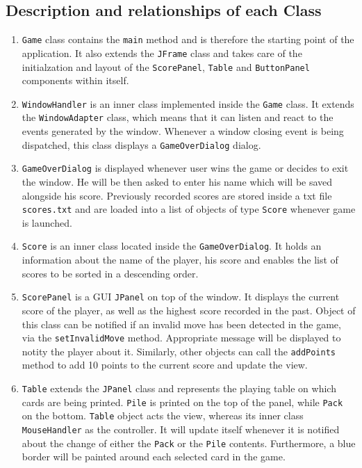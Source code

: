 \documentclass[a4paper, 11pt, titlepage]{article}
\begin{document}
\subsection{Description and relationships of each Class}
\begin{enumerate}
	\item \texttt{Game} class contains the \texttt{main} method and is therefore the 
		starting point of the application. It also extends the \texttt{JFrame} class and 
		takes care of the initialzation and layout of the \texttt{ScorePanel}, 
		\texttt{Table} and \texttt{ButtonPanel} components within itself.
		
	\item \texttt{WindowHandler} is an inner class implemented inside the \texttt{Game}
		class. It extends the \texttt{WindowAdapter} class, which means that it can 
		listen and react to the events generated by the window. Whenever a window closing 
		event is being dispatched, this class displays a \texttt{GameOverDialog} dialog.
		
	\item \texttt{GameOverDialog} is displayed whenever user wins the game or decides to
		exit the window. He will be then asked to enter his name which will be saved
		alongside his score. Previously recorded scores are stored inside a txt file
		\texttt{scores.txt} and are loaded into a list of objects of type \texttt{Score}
		whenever game is launched.
		
	\item \texttt{Score} is an inner class located inside the \texttt{GameOverDialog}. 
		It holds an information about the name of the player, his score and enables the
		list of scores to be sorted in a descending order. 
		
	\item \texttt{ScorePanel} is a GUI \texttt{JPanel} on top of the window. It displays
		the current score of the player, as well as the highest score recorded in the 
		past. Object of this class can be notified if an invalid move has been detected 
		in the game, via the \texttt{setInvalidMove} method. Appropriate message will be 
		displayed to notity the player about it. Similarly, other objects can call 
		the \texttt{addPoints} method to add 10 points to the current score and update
		the view.
		
	\item \texttt{Table} extends the \texttt{JPanel} class and represents the playing 
		table on which cards are being printed. \texttt{Pile} is printed on the top of 
		the panel, while \texttt{Pack} on the bottom. \texttt{Table} object acts the 
		view, whereas its inner class \texttt{MouseHandler} as the controller. 
		It will update itself whenever it is notified about the change of
		either the \texttt{Pack} or the \texttt{Pile} contents. Furthermore, a blue border
		will be painted around each selected card in the game.
		

\end{enumerate}
\end{document}
